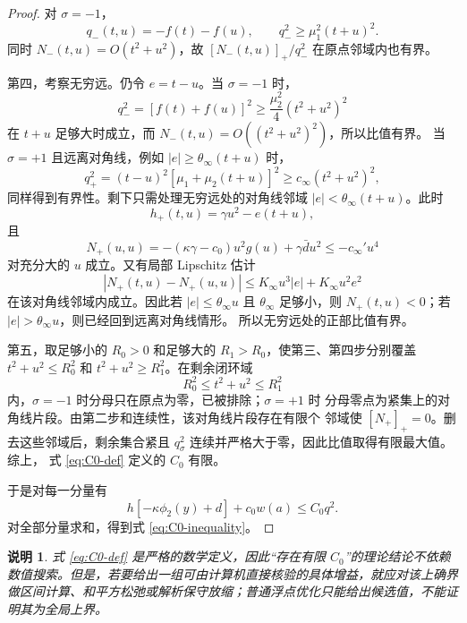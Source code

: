 \documentclass[UTF8,a4paper,12pt]{ctexart}
\newtheorem{remark}{说明}
\newcommand{\abs}[1]{\left\lvert #1\right\rvert}
\begin{document}
\begin{proof}
对 $\sigma=-1$，
\begin{equation}
 q_-(t,u)=-f(t)-f(u),\qquad
 q_-^2\ge\mu_1^2(t+u)^2.
\end{equation}
同时 $N_-(t,u)=O(t^2+u^2)$，故
$[N_-(t,u)]_+/q_-^2$ 在原点邻域内也有界。

第四，考察无穷远。仍令 $e=t-u$。当 $\sigma=-1$ 时，
\begin{equation}
 q_-^2=[f(t)+f(u)]^2
 \ge \frac{\mu_2^2}{4}(t^2+u^2)^2
\end{equation}
在 $t+u$ 足够大时成立，而 $N_-(t,u)=O((t^2+u^2)^2)$，所以比值有界。
当 $\sigma=+1$ 且远离对角线，例如
$\abs e\ge\theta_\infty(t+u)$ 时，
\begin{equation}
 q_+^2=(t-u)^2[\mu_1+\mu_2(t+u)]^2
 \ge c_\infty(t^2+u^2)^2,
\end{equation}
同样得到有界性。剩下只需处理无穷远处的对角线邻域
$\abs e<\theta_\infty(t+u)$。此时
\begin{equation}
 h_+(t,u)=\gamma u^2-e(t+u),
\end{equation}
且
\begin{equation}
 N_+(u,u)=-(\kappa\gamma-c_0)u^2g(u)+\gamma\bar d u^2
 \le -c_\infty' u^4
\end{equation}
对充分大的 $u$ 成立。又有局部 Lipschitz 估计
\begin{equation}
 \abs{N_+(t,u)-N_+(u,u)}
 \le K_\infty u^3\abs e+K_\infty u^2e^2
\end{equation}
在该对角线邻域内成立。因此若
$\abs e\le \theta_\infty u$ 且 $\theta_\infty$ 足够小，则
$N_+(t,u)<0$；若 $\abs e>\theta_\infty u$，则已经回到远离对角线情形。
所以无穷远处的正部比值有界。

第五，取足够小的 $R_0>0$ 和足够大的 $R_1>R_0$，使第三、第四步分别覆盖
$t^2+u^2\le R_0^2$ 和 $t^2+u^2\ge R_1^2$。在剩余闭环域
\begin{equation}
 R_0^2\le t^2+u^2\le R_1^2
\end{equation}
内，$\sigma=-1$ 时分母只在原点为零，已被排除；$\sigma=+1$ 时
分母零点为紧集上的对角线片段。由第二步和连续性，该对角线片段存在有限个
邻域使 $[N_+]_+=0$。删去这些邻域后，剩余集合紧且
$q_\sigma^2$ 连续并严格大于零，因此比值取得有限最大值。综上，
式 \eqref{eq:C0-def} 定义的 $C_0$ 有限。

于是对每一分量有
\begin{equation}
 h[-\kappa\phi_2(y)+d]+c_0w(a)\le C_0q^2.
\end{equation}
对全部分量求和，得到式 \eqref{eq:C0-inequality}。
\end{proof}

\begin{remark}
式 \eqref{eq:C0-def} 是严格的数学定义，因此“存在有限 $C_0$”的理论结论不依赖数值搜索。但是，若要给出一组可由计算机直接核验的具体增益，就应对该上确界做区间计算、和平方松弛或解析保守放缩；普通浮点优化只能给出候选值，不能证明其为全局上界。
\end{remark}
\end{document}
